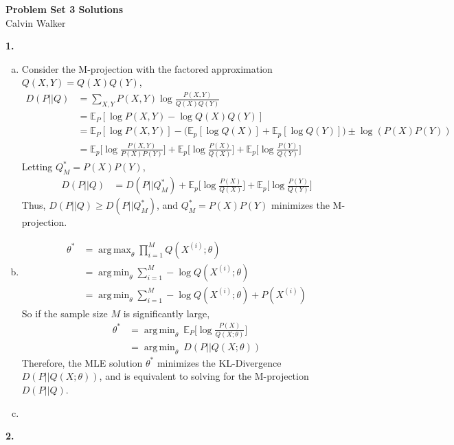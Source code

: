 \documentclass{article}
\DeclareMathOperator*{\argmax}{arg\,max}
\DeclareMathOperator*{\argmin}{arg\,min}
\begin{document}
\begin{center}
    \Large{\textbf{Problem Set 3 Solutions}} \\[0.25ex]
    Calvin Walker
\end{center}
\textbf{1.}
\begin{enumerate}[(a)]
    \item Consider the M-projection with the factored approximation $Q(X, Y) = Q(X)Q(Y)$, \begin{align*}
        D(P || Q) &= \sum_{X, Y} P(X, Y) \log \frac{P(X, Y)}{Q(X)Q(Y)} \\[0.5ex]
        &= \mathbb{E}_P[\log P(X, Y) - \log Q(X)Q(Y)] \\[0.5ex]
        &= \mathbb{E}_P[\log P(X, Y)] - \bigg(\mathbb{E}_p[\log Q(X)] + \mathbb{E}_p[\log Q(Y)]\bigg) \pm \log(P(X)P(Y)) \\[0.5ex]
        &= \mathbb{E}_p \bigg[\log \frac{P(X, Y)}{P(X)P(Y)}\bigg] + \mathbb{E}_p \bigg[\log \frac{P(X)}{Q(X)}\bigg] + \mathbb{E}_p \bigg[\log \frac{P(Y)}{Q(Y)}\bigg]
    \end{align*}
    Letting $Q^*_M = P(X)P(Y)$, \begin{align*}
        D(P || Q) &= D(P || Q^*_M) + \mathbb{E}_p \bigg[\log \frac{P(X)}{Q(X)}\bigg] + \mathbb{E}_p \bigg[\log \frac{P(Y)}{Q(Y)}\bigg]
    \end{align*}
    Thus, $D(P || Q) \geq D(P || Q^*_M)$, and $Q^*_M = P(X)P(Y)$ minimizes the M-projection. 
    \item \begin{align*}
        \theta^* &= \argmax_\theta \prod_{i = 1}^{M}Q(X^{(i)} ; \theta) \\[0.5ex]
        &= \argmin_\theta \sum_{i = 1}^{M} - \log Q(X^{(i)} ; \theta) \\[0.5ex]
        &= \argmin_\theta \sum_{i = 1}^{M} - \log Q(X^{(i)} ; \theta) + P(X^{(i)})
    \end{align*}
    So if the sample size $M$ is significantly large, \begin{align*}
        \theta^* &=  \argmin_\theta \ \mathbb{E}_P \bigg[\log \frac{P(X)}{Q(X ; \theta)} \bigg] \\[0.75ex]
        &= \argmin_\theta \ D(P || Q(X ; \theta))
    \end{align*}
    Therefore, the MLE solution $\theta^*$ minimizes the KL-Divergence $D(P || Q(X ; \theta))$, and is equivalent to solving for the M-projection $D(P||Q)$. 
    \item 
\end{enumerate}
\textbf{2.} 
\end{document}

